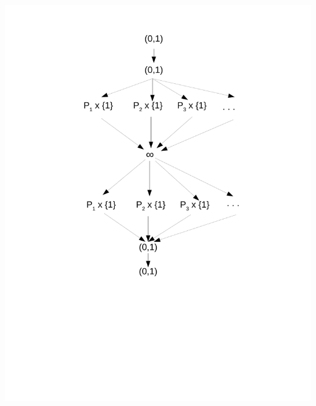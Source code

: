 \documentclass[fleqn,12pt]{article}
\begin{document}
\includegraphics[scale=.4]{Ex3b.pdf}
\end{document}
